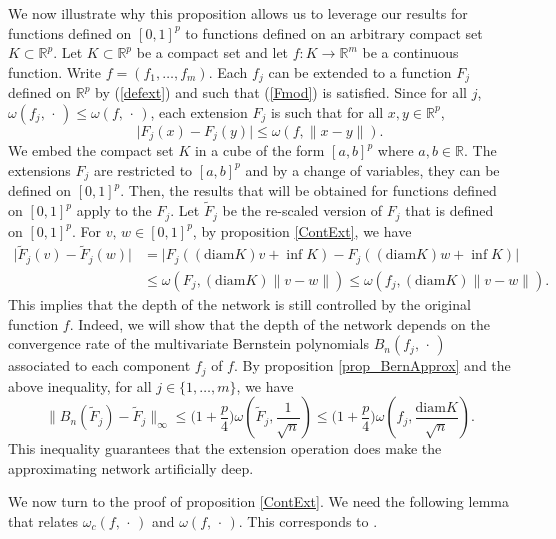 \documentclass[anon,12pt]{colt2021} %
\begin{document}
We now illustrate why this proposition allows us to leverage our results for functions defined on $[0,1]^{p}$ to functions defined on an arbitrary compact set $K \subset \mathbb{R}^{p}$. Let $K \subset \mathbb{R}^{p}$ be a compact set and let $f: K \rightarrow \mathbb{R}^{m}$ be a continuous function. Write $f=(f_{1},\dots,f_{m})$. Each $f_{j}$ can be extended to a function $F_{j}$ defined on $\mathbb{R}^{p}$ by (\ref{defext}) and such that (\ref{Fmod}) is satisfied. Since for all $j$, $\omega(f_{j}, \, \cdot \,) \leq \omega(f,\, \cdot \,)$, each extension $F_{j}$ is such that for all $x,y \in \mathbb{R}^{p}$,
\begin{equation*}
     \vert F_{j}(x) - F_{j}(y) \vert \leq \omega(f, \|x-y\|).
\end{equation*}
We embed the compact set $K$ in a cube of the form $[a,b]^{p}$ where $a,b \in \mathbb{R}$. The extensions $F_{j}$ are restricted to $[a,b]^{p}$ and by a change of variables, they can be defined on $[0,1]^{p}$. Then, the results that will be obtained for functions defined on $[0,1]^{p}$ apply to the $F_{j}$. Let $\tilde F_{j}$ be the re-scaled version of $F_{j}$ that is defined on $[0,1]^{p}$. For $v, \, w \in [0,1]^{p}$, by proposition \ref{ContExt}, we have
\begin{align*}
    \vert \tilde F_{j}(v) - \tilde F_{j}(w) \vert &= \vert F_{j}((\text{diam} K) v + \inf K) - F_{j}((\text{diam} K) w + \inf K) \vert \\
    & \leq \omega(F_{j}, (\text{diam} K) \|v-w\|) \leq \omega(f_{j}, (\text{diam} K) \|v-w\|).
\end{align*}
This implies that the depth of the network is still controlled by the original function $f$. Indeed, we will show that the depth of the network depends on the convergence rate of the multivariate Bernstein polynomials $B_{n}(f_{j}, \, \cdot \,)$ associated to each component $f_{j}$ of $f$. By proposition \ref{prop_BernApprox} and the above inequality, for all $j \in \{1, \dots, m \}$, we have
\begin{equation*}
    \| B_{n}(\tilde F_{j}) - \tilde F_{j} \|_{\infty} \leq \bigg( 1+ \frac{p}{4} \bigg)\omega( \tilde F_{j}, \frac{1}{\sqrt{n}}) 
    \leq \bigg( 1+ \frac{p}{4} \bigg) \omega(f_{j}, \frac{\text{diam}K}{\sqrt{n}}).
\end{equation*}
This inequality guarantees that the extension operation does make the approximating network artificially deep.

We now turn to the proof of proposition \ref{ContExt}. We need the following lemma that relates $\omega_{c}(f, \, \cdot \,)$ and $\omega(f, \, \cdot \,)$. This corresponds to \citep[Lemma 6.1]{BookModCOnt}.
\end{document}
